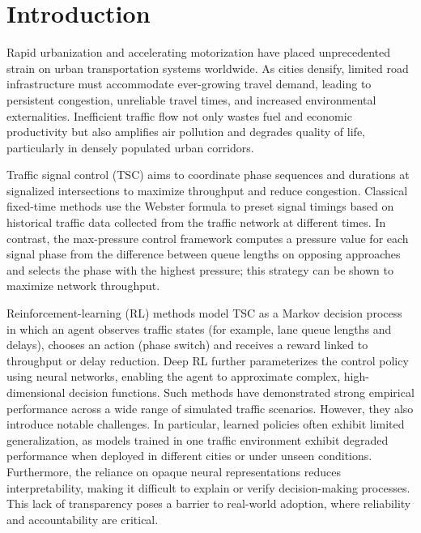 \section{Introduction}
Rapid urbanization and accelerating motorization have placed unprecedented strain on urban transportation systems worldwide. As cities densify, limited road infrastructure must accommodate ever-growing travel demand, leading to persistent congestion, unreliable travel times, and increased environmental externalities. Inefficient traffic flow not only wastes fuel and economic productivity but also amplifies air pollution and degrades quality of life, particularly in densely populated urban corridors. \par
Traffic signal control (TSC) aims to coordinate phase sequences and durations at signalized intersections to maximize throughput and reduce congestion. Classical fixed-time methods use the Webster formula\cite{webster} to preset signal timings based on historical traffic data collected from the traffic network at different times. In contrast, the max-pressure control framework\cite{MERCADER2020275} computes a pressure value for each signal phase from the difference between queue lengths on opposing approaches and selects the phase with the highest pressure; this strategy can be shown to maximize network throughput.\par
Reinforcement-learning (RL) methods model TSC as a Markov decision process in which an agent observes traffic states (for example, lane queue lengths and delays), chooses an action (phase switch) and receives a reward linked to throughput or delay reduction. Deep RL further parameterizes the control policy using neural networks, enabling the agent to approximate complex, high-dimensional decision functions. Such methods have demonstrated strong empirical performance across a wide range of simulated traffic scenarios. However, they also introduce notable challenges. In particular, learned policies often exhibit limited generalization, as models trained in one traffic environment exhibit degraded performance when deployed in different cities or under unseen conditions. Furthermore, the reliance on opaque neural representations reduces interpretability, making it difficult to explain or verify decision-making processes. This lack of transparency poses a barrier to real-world adoption, where reliability and accountability are critical.\par

